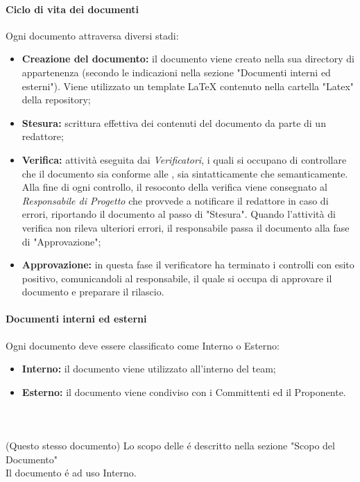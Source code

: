       \paragraph{Ciclo di vita dei documenti\\}
      Ogni documento attraversa diversi stadi:
      \begin{itemize}
        \item \textbf{Creazione del documento:} il documento viene creato nella sua directory di appartenenza (secondo le indicazioni nella sezione "Documenti interni ed esterni"). Viene utilizzato un template \LaTeX{} contenuto nella cartella "Latex" della repository;
        \item \textbf{Stesura:} scrittura effettiva dei contenuti del documento da parte di un redattore;
        \item \textbf{Verifica:} attività eseguita dai \textit{Verificatori}, i quali si occupano di controllare che il documento sia conforme alle \textit{\NdP{}}, sia sintatticamente che semanticamente. Alla fine di ogni controllo, il resoconto della verifica viene consegnato al \textit{Responsabile di Progetto} che provvede a notificare il redattore in caso di errori, riportando il documento al passo di "Stesura". Quando l'attività di verifica non rileva ulteriori errori, il responsabile passa il documento alla fase di "Approvazione";
        \item \textbf{Approvazione:} in questa fase il verificatore ha terminato i controlli con esito positivo, comunicandoli al responsabile, il quale si occupa di approvare il documento e preparare il rilascio.
      \end{itemize}

      \paragraph{Documenti interni ed esterni\\}
      Ogni documento deve essere classificato come Interno o Esterno:
      \begin{itemize}
        \item \textbf{Interno:} il documento viene utilizzato all'interno del team;
        \item \textbf{Esterno:} il documento viene condiviso con i Committenti ed il Proponente.
      \end{itemize}

      \paragraph{\NdP\\}
      (Questo stesso documento) Lo scopo delle \textit{\NdP{}} é descritto nella sezione  "Scopo del Documento"\\
      Il documento é ad uso Interno.

